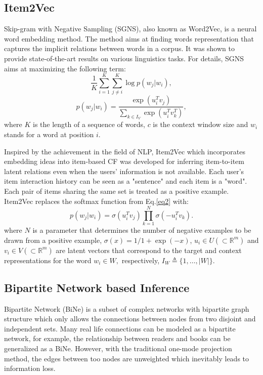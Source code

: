\documentclass[manuscript,noacm]{acmart}
\begin{document}
\subsection{Item2Vec}
Skip-gram with Negative Sampling (SGNS), also known as Word2Vec, is a neural word embedding method\cite{mikolov2013distributed}. The method aims at finding words representation that captures the implicit relations between words in a corpus. It was shown to provide state-of-the-art results on various linguistics tasks. For details, SGNS aims at maximizing the following term:
\begin{equation}
\label{eq1}
\frac{1}{K} \sum_{i=1}^{K} \sum_{j \neq i}^{K} \log p\left(w_{j} | w_{i}\right),
\end{equation}
\begin{equation}
\label{eq2}
p\left(w_{j} | w_{i}\right)=\frac{\exp \left(u_{i}^{T} v_{j}\right)}{\sum_{k \in I_{V}} \exp \left(u_{i}^{T} v_{k}^{T}\right)},
\end{equation}
where $K$ is the length of a sequence of words, $c$ is the context window size and $w_{i}$ stands for a word at position $i$.


Inspired by the achievement in the field of NLP, Item2Vec which incorporates embedding ideas into item-based CF was developed for inferring item-to-item latent relations even when the users' information is not available. Each user's item interaction history can be seen as a "sentence" and each item is a "word". Each pair of items sharing the same set is treated as a positive example. Item2Vec replaces the softmax function from Eq.\eqref{eq2} with:
\begin{equation}
p\left(w_{j} | w_{i}\right)=\sigma\left(u_{i}^{T} v_{j}\right) \prod_{k=1}^{N} \sigma\left(-u_{i}^{T} v_{k}\right).
\end{equation}
where $N$ is a parameter that determines the number of negative examples to be drawn from a positive example, $\sigma(x)=1 / 1+\exp (-x)$, $u_{i} \in U\left(\subset \mathbb{R}^{m}\right)$ and $v_{i} \in V\left(\subset \mathbb{R}^{m}\right)$ are latent
vectors that correspond to the target and context representations for the word $w_{i} \in W,$ respectively,
$I_{W} \triangleq\{1, \ldots,|W|\}$\cite{barkan2016item2vec}.



\subsection{Bipartite Network based Inference}
Bipartite Network (BiNe) is a subset of complex networks with bipartite graph structure which only allows the connections between nodes from two disjoint and independent sets. Many real life connections can be modeled as a bipartite network, for example, the relationship between readers and books can be generalized as a BiNe. However, with the traditional one-mode projection method, the edges between too nodes are unweighted which inevitably leads to information loss.
\end{document}
